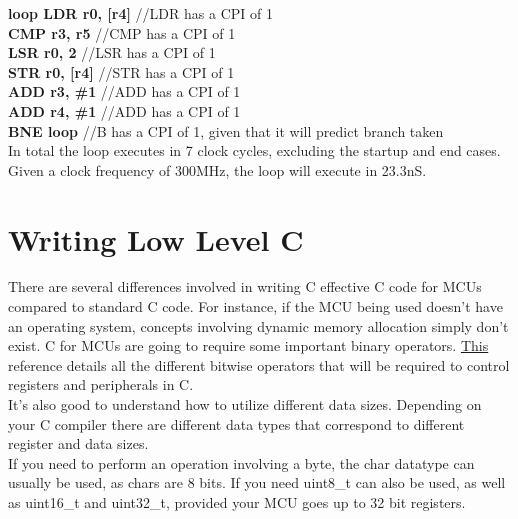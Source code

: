 \documentclass[10pt]{article}
\begin{document}
\textbf{loop    \indent    LDR r0, [r4]} //LDR has a CPI of 1 \\
\indent\indent\indent\textbf{CMP r3, r5} //CMP has a CPI of 1\\
\indent\indent\indent\textbf{LSR r0, 2} //LSR has a CPI of 1\\
\indent\indent\indent\textbf{STR r0, [r4]} //STR has a CPI of 1\\
\indent\indent\indent\textbf{ADD r3, \#1} //ADD has a CPI of 1\\
\indent\indent\indent\textbf{ADD r4, \#1} //ADD has a CPI of 1\\
\indent\indent\indent\textbf{BNE loop} //B has a CPI of 1, given that it will predict branch taken\\

In total the loop executes in 7 clock cycles, excluding the startup and end cases. Given a clock frequency of 300MHz, the loop will execute in 23.3nS.

\section{Writing Low Level C}
There are several differences involved in writing C effective C code for MCUs compared to standard C code. For instance, if the MCU being used doesn't have an operating system, concepts involving dynamic memory allocation simply don't exist. C for MCUs are going to require some important binary operators. \href{http://www.tutorialspoint.com/cprogramming/c_bitwise_operators.htm}{This} reference details all the different bitwise operators that will be required to control registers and peripherals in C.\\

It's also good to understand how to utilize different data sizes. Depending on your C compiler there are different data types that correspond to different register and data sizes. \\

If you need to perform an operation involving a byte, the char datatype can usually be used, as chars are 8 bits. If you need uint8\_t can also be used, as well as uint16\_t and uint32\_t, provided your MCU goes up to 32 bit registers.
\end{document}
